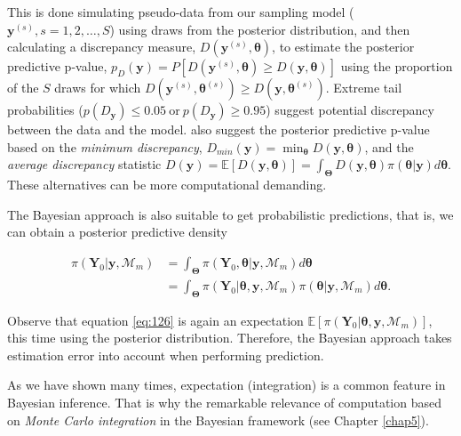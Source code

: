 This is done simulating pseudo-data from our sampling model ($\mathbf{y}^{(s)}, s=1,2,\dots,S$) using draws from the posterior distribution, and then calculating a discrepancy measure, $D(\mathbf{y}^{(s)},\bm{\theta})$, to estimate the posterior predictive p-value, $p_D(\mathbf{y})=P[D(\mathbf{y}^{(s)},\bm{\theta})\geq D(\mathbf{y},\bm{\theta})]$ using the proportion of the $S$ draws for which $D(\mathbf{y}^{(s)},\bm{\theta}^{(s)})\geq D(\mathbf{y},\bm{\theta}^{(s)})$. Extreme tail probabilities ($p(D_{\mathbf{y}}) \leq 0.05  \ \text{or} \ p(D_{\mathbf{y}}) \geq 0.95$) suggest potential discrepancy between the data and the model. \cite{gelman1996posterior} also suggest the posterior predictive p-value based on the \textit{minimum discrepancy}, $D_{min}(\mathbf{y})=\min_{\bm{\theta}}D(\mathbf{y},\bm{\theta})$, and the \textit{average discrepancy} statistic $D(\mathbf{y})=\mathbb{E}[D(\mathbf{y},\bm{\theta})]=\int_{\mathbf{\Theta}}D(\mathbf{y},\bm{\theta})\pi(\mathbf{\theta|\mathbf{y}})d\bm{\theta}$. These alternatives can be more computational demanding.

The Bayesian approach is also suitable to get probabilistic predictions, that is, we can obtain a posterior predictive density 

\begin{align}
	\pi(\mathbf{Y}_0|\mathbf{y},\mathcal{M}_m) & =\int_{\mathbf{\Theta}}\pi(\mathbf{Y}_0,\bm{\theta}|\mathbf{y},\mathcal{M}_m)d\bm{\theta}\nonumber\\
	&=\int_{\mathbf{\Theta}}\pi(\mathbf{Y}_0|\bm{\theta},\mathbf{y},\mathcal{M}_m)\pi(\bm{\theta}|\mathbf{y},\mathcal{M}_m)d\bm{\theta}.
	\label{eq:126}
\end{align}

Observe that equation \ref{eq:126} is again an expectation $\mathbb{E}[\pi(\mathbf{Y}_0|\bm{\theta},\mathbf{y},\mathcal{M}_m)]$, this time using the posterior distribution. Therefore,  the Bayesian approach takes estimation error into account when performing prediction. 

As we have shown many times, expectation (integration) is a common feature in Bayesian inference. That is why the remarkable relevance of computation based on \textit{Monte Carlo integration} in the Bayesian framework (see Chapter \ref{chap5}).  

